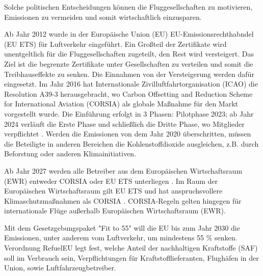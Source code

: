 
Solche politischen Entscheidungen können die Fluggesellschaften zu motivieren, Emissionen zu vermeiden und somit wirtschaftlich einzusparen.

Ab Jahr 2012 wurde in der Europäische Union (EU) EU-Emissionsrechthabndel (EU ETS) für Luftverkehr eingeführt.
Ein Großteil der Zertifikate wird unentgeltlich für die Fluggesellschaften zugeteilt, den Rest wird versteigert. 
Das Ziel ist die begrenzte Zertifikate unter Gesellschaften zu verteilen und somit die Treibhauseffekte zu senken.
Die Einnahmen von der Versteigerung werden dafür eingesetzt.\cite{conrady2019luftverkehr}
Im Jahr 2016 hat Internationale Zivilluftfahrtorganisation (ICAO) die Resolution A39-3 herausgebracht, 
wo Carbon Offsetting and Reduction Scheme for International Aviation (CORSIA) als globale Maßnahme für den Markt vorgestellt wurde. 
Die Einführung erfolgt in 3 Phasen: 
Pilotphase 2023; ab Jahr 2024 verläuft die Erste Phase und schließlich die Dritte Phase, wo Mitglieder verpflichtet
\cite{conrady2019luftverkehr}. 
Werden die Emissionen von dem Jahr 2020 überschritten, müssen die Beteiligte in anderen Bereichen die Kohlenstoffdioxide ausgleichen, z.B.
durch Beforstung oder anderen Klimainitiativen. 

Ab Jahr 2027 werden alle Betreiber aus dem Europäischen Wirtschaftsraum (EWR) entweder CORSIA oder EU ETS unterliegen \cite{uba_aviation_2023}.
Im Raum der Europäischen Wirtschaftsraum gilt EU ETS und hat anspruchsvollere Klimaschutzmaßnahmen als CORSIA \cite{uba_aviation_2023}.
CORSIA-Regeln gelten hingegen für internationale Flüge außerhalb Europäischen Wirtschaftsraum (EWR).

Mit dem Gesetzgebungspaket "Fit to 55" will die EU bis zum Jahr 2030 die Emissionen, unter anderem vom Luftverkehr, um mindestens 55 \% senken.
Verordnung RefuelEU legt fest, welche Anteil der nachhaltigen Kraftstoffe (SAF) soll im Verbrauch sein, Verpflichtungen für 
Kraftstofflieferanten, Flughäfen in der Union, sowie Luftfahrzeugbetreiber.
